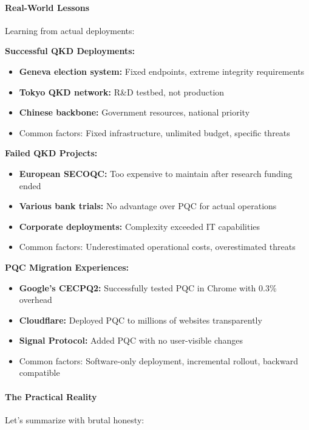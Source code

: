 \documentclass[11pt,a4paper]{article}
\begin{document}
\paragraph{Real-World Lessons}

Learning from actual deployments:

\textbf{Successful QKD Deployments:}
\begin{itemize}
    \item \textbf{Geneva election system:} Fixed endpoints, extreme integrity requirements
    \item \textbf{Tokyo QKD network:} R\&D testbed, not production
    \item \textbf{Chinese backbone:} Government resources, national priority
    \item Common factors: Fixed infrastructure, unlimited budget, specific threats
\end{itemize}

\textbf{Failed QKD Projects:}
\begin{itemize}
    \item \textbf{European SECOQC:} Too expensive to maintain after research funding ended
    \item \textbf{Various bank trials:} No advantage over PQC for actual operations
    \item \textbf{Corporate deployments:} Complexity exceeded IT capabilities
    \item Common factors: Underestimated operational costs, overestimated threats
\end{itemize}

\textbf{PQC Migration Experiences:}
\begin{itemize}
    \item \textbf{Google's CECPQ2:} Successfully tested PQC in Chrome with 0.3\% overhead
    \item \textbf{Cloudflare:} Deployed PQC to millions of websites transparently
    \item \textbf{Signal Protocol:} Added PQC with no user-visible changes
    \item Common factors: Software-only deployment, incremental rollout, backward compatible
\end{itemize}

\paragraph{The Practical Reality}

Let's summarize with brutal honesty:
\end{document}
